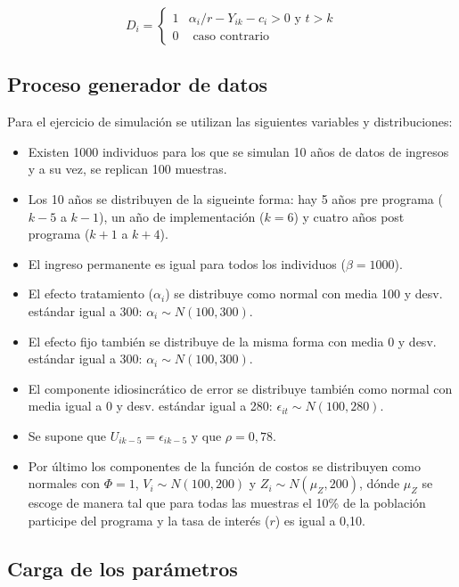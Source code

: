 \documentclass[]{article}
\begin{document}
\[ D_{i}=\begin{cases} 1 & \alpha_{i}/r-Y_{ik}-c_{i}>0\text{ y }t>k\\ 0 & \text{ caso contrario}\end{cases} \]

\subsection{Proceso generador de
datos}\label{proceso-generador-de-datos}

Para el ejercicio de simulación se utilizan las siguientes variables y
distribuciones:

\begin{itemize}
\itemsep1pt\parskip0pt
\item
  Existen 1000 individuos para los que se simulan 10 años de datos de
  ingresos y a su vez, se replican 100 muestras.
\item
  Los 10 años se distribuyen de la sigueinte forma: hay 5 años pre
  programa ($k-5$ a $k-1$), un año de implementación ($k=6$) y cuatro
  años post programa ($k+1$ a $k+4$).
\item
  El ingreso permanente es igual para todos los individuos
  ($\beta=1000$).
\item
  El efecto tratamiento ($\alpha_{i}$) se distribuye como normal con
  media 100 y desv. estándar igual a 300: $\alpha_{i}\sim N(100,300)$.
\item
  El efecto fijo también se distribuye de la misma forma con media 0 y
  desv. estándar igual a 300: $\alpha_{i}\sim N(100,300)$.
\item
  El componente idiosincrático de error se distribuye también como
  normal con media igual a 0 y desv. estándar igual a 280:
  $\epsilon_{it}\sim N(100,280)$.
\item
  Se supone que $U_{ik-5}=\epsilon_{ik-5}$ y que $\rho=0,78$.
\item
  Por último los componentes de la función de costos se distribuyen como
  normales con $\Phi=1$, $V_{i}\sim N(100,200)$ y
  $Z_{i}\sim N(\mu_{Z},200)$, dónde $\mu_{Z}$ se escoge de manera tal
  que para todas las muestras el 10\% de la población participe del
  programa y la tasa de interés ($r$) es igual a 0,10.
\end{itemize}

\subsection{Carga de los parámetros}\label{carga-de-los-parametros}
\end{document}

